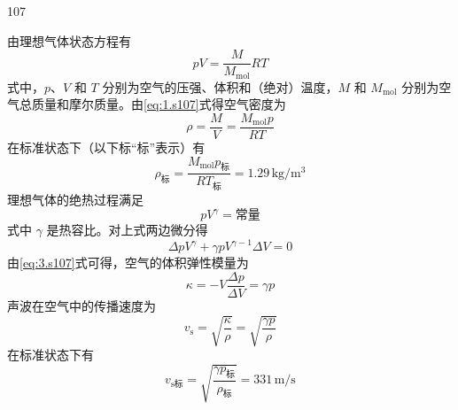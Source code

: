 \begin{solution}{107}
\begin{subsolution}
由理想气体状态方程有
\begin{equation}
p V = \frac{M}{M_{\mathrm{mol}}} R T
\label{eq:1.s107}
\end{equation}
式中，$p$、$V$ 和 $T$ 分别为空气的压强、体积和（绝对）温度，$M$ 和 $M_{\mathrm{mol}}$ 分别为空气总质量和摩尔质量。由\eqref{eq:1.s107}式得空气密度为
\[
\rho = \frac{M}{V} = \frac{M_{\mathrm{mol}} p}{R T}
\]
在标准状态下（以下标“标”表示）有
\begin{equation}
\rho_{\text{标}} = \frac{M_{\mathrm{mol}} p_{\text{标}}}{R T_{\text{标}}} = 1.29\,\mathrm{kg/m^{3}}
\label{eq:2.s107}
\end{equation}
理想气体的绝热过程满足
\[
p V^{\gamma} = \text{常量}
\]
式中 $\gamma$ 是热容比。对上式两边微分得
\begin{equation}
\Delta p V^{\gamma} + \gamma p V^{\gamma-1} \Delta V = 0
\label{eq:3.s107}
\end{equation}
由\eqref{eq:3.s107}式可得，空气的体积弹性模量为
\begin{equation}
\kappa = - V \frac{\Delta p}{\Delta V} = \gamma p
\label{eq:4.s107}
\end{equation}
声波在空气中的传播速度为
\[
v_{\mathrm{s}} = \sqrt{\frac{\kappa}{\rho}} = \sqrt{\frac{\gamma p}{\rho}}
\]
在标准状态下有
\begin{equation}
v_{\mathrm{s标}} = \sqrt{\frac{\gamma p_{\text{标}}}{\rho_{\text{标}}}} = 331\,\mathrm{m/s}
\label{eq:5.s107}
\end{equation}
\end{subsolution}


\end{solution}
